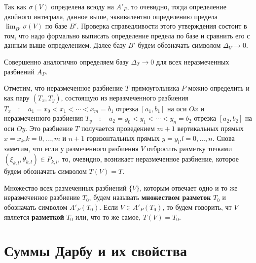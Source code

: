 \par Так как $\sigma (V)$ определена всюду на $A'_P$, то очевидно, тогда определение двойного интеграла, данное выше, эквивалентно определению предела $\lim_{B'} \sigma (V)$ по базе $B'$. Проверка справедливости этого утверждения состоит в том, что надо формально выписать определение предела по базе и сравнить его с данным выше определением. Далее базу $B'$ будем обозначать символом $\Delta_V \to 0$.
\par Совершенно аналогично определяем базу $\Delta_T \to 0$ для всех неразмеченных разбиений $A_P$.
\par Отметим, что неразмеченное разбиение $T$ прямоугольника $P$ можно определить и как пару $(T_x,T_y)$, состоящую из неразмеченного разбиения $T_x\quad :\quad a_1=x_0<x_1<\cdots <x_m=b_1$ отрезка $[a_1,b_1]$ на оси $Ox$ и неразмеченного разбиения $T_y\quad : \quad a_2=y_0<y_1<\cdots <y_n=b_2$ отрезка $[a_2,b_2]$ на оси $Oy$. Это разбиение $T$ получается проведением $m+1$ вертикальных прямых $x=x_k$,\quad $k=0,\ldots ,m$ и $n+1$ горизонтальных прямых  $y=y_l$,\quad $l=0,\ldots ,n$. Снова заметим, что если у размеченного разбиения $V$ отбросить разметку точками $(\xi_{k,l},\theta_{k,l})\in P_{k,l}$, то, очевидно, возникает неразмеченное разбиение, которое будем обозначать символом $T(V)=T$.
\begin{object} 
Множество всех размеченных разбиений $\{ V\}$, которым отвечает одно и то же неразмеченное разбиение $T_0$, будем называть \textbf{множеством разметок} $T_0$ и обозначать символом $A'_P(T_0)$. Если $V\in A'_P(T_0)$, то будем говорить, чт $V$ является \textbf{разметкой} $T_0$ или, что то же самое, $T(V)=T_0$.
\end{object}

\section{Суммы Дарбу и их свойства}

